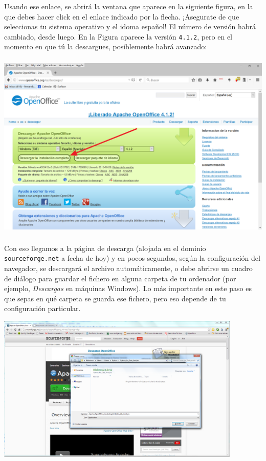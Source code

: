 \documentclass[10pt,a4paper]{article}\usepackage[]{graphicx}\usepackage[]{color}
\begin{document}
Usando ese enlace, se abrirá la ventana que aparece en la siguiente figura, en la que debes hacer
click en el enlace indicado por la flecha. ¡Asegurate de que seleccionas tu sistema operativo y el idoma español! El número de versión habrá cambiado, desde luego. En la
Figura aparece la versión {\tt 4.1.2}, pero en el momento en que tú la descargues, posiblemente habrá avanzado:
    \begin{center}
    \includegraphics[height=9cm]{../fig/Tut00-WebOpenOffice-02-201605.png}
    \end{center}

Con eso llegamos a la página de descarga (alojada en el dominio {\tt sourceforge.net} a fecha de
hoy) y en pocos segundos, según la configuración del navegador, se descargará el archivo
automáticamente, o debe abrirse un cuadro de diálogo para guardar el fichero en alguna carpeta de
tu ordenador (por ejemplo, {\em Descargas} en máquinas Windows). Lo más importante en este paso es
que sepas en qué carpeta se guarda ese fichero, pero eso depende de tu configuración particular.

    \begin{center}
    \includegraphics[height=7cm]{../fig/Tut00-WebOpenOffice-02.png}
    \end{center}
\end{document}
